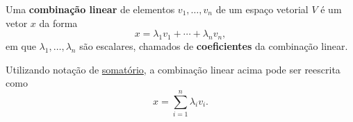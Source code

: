 \begin{definition}
	Uma \textbf{combinação linear} de elementos $v_1,\ldots,v_n$ de um espaço vetorial $V$ é um vetor $x$ da forma
	\[x=\lambda_1v_1+\cdots+\lambda_nv_n,\]
	em que $\lambda_1,\ldots,\lambda_n$ são escalares, chamados de \textbf{coeficientes} da combinação linear.
	
	Utilizando notação de \href{http://mtm.ufsc.br/~cordeiro/ensino/mtm3112.algebra.linear/04.span/con_somatorio_moodle.html}{somatório}, a combinação linear acima pode ser reescrita como
	\[x=\sum_{i=1}^n\lambda_i v_i.\]
\end{definition}